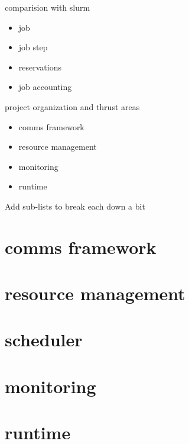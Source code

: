 \documentclass[default,pdf,colorBG,slideColor]{prosper}
\begin{document}
\begin{slide}{comparision with slurm}{\small
\begin{itemize}
  \item{job}
  \item{job step}
  \item{reservations}
  \item{job accounting}
\end{itemize}
}\end{slide}
\begin{slide}{project organization and thrust areas}{\small
\begin{itemize}
  \item{comms framework}
  \item{resource management}
  \item{monitoring}
  \item{runtime}
\end{itemize}
Add sub-lists to break each down a bit
}\end{slide}
\part{comms framework}
\part{resource management}
\part{scheduler}
\part{monitoring}
\part{runtime}
\end{document}
